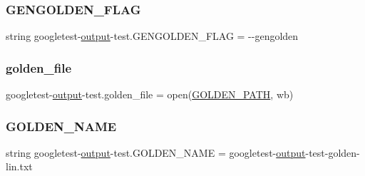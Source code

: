 \subsubsection{\texorpdfstring{GENGOLDEN\_FLAG}{GENGOLDEN\_FLAG}}
{\footnotesize\ttfamily string googletest-\/\mbox{\hyperlink{namespacegoogletest-output-test_ab3df9ce09186215a36c30454cf282417}{output}}-\/test.\+G\+E\+N\+G\+O\+L\+D\+E\+N\+\_\+\+F\+L\+AG = \textquotesingle{}-\/-\/gengolden\textquotesingle{}}

\mbox{\label{namespacegoogletest-output-test_a1f278fb4e124e36b91d94699d921b1c4}} 
\subsubsection{\texorpdfstring{golden\_file}{golden\_file}}
{\footnotesize\ttfamily googletest-\/\mbox{\hyperlink{namespacegoogletest-output-test_ab3df9ce09186215a36c30454cf282417}{output}}-\/test.\+golden\+\_\+file = open(\mbox{\hyperlink{namespacegoogletest-output-test_aaf2c3cbfc15d83d986e1e2ba99a94a3e}{G\+O\+L\+D\+E\+N\+\_\+\+P\+A\+TH}}, \textquotesingle{}wb\textquotesingle{})}

\mbox{\label{namespacegoogletest-output-test_a66b45fb215424c968b479fbf864f1e7f}} 
\subsubsection{\texorpdfstring{GOLDEN\_NAME}{GOLDEN\_NAME}}
{\footnotesize\ttfamily string googletest-\/\mbox{\hyperlink{namespacegoogletest-output-test_ab3df9ce09186215a36c30454cf282417}{output}}-\/test.\+G\+O\+L\+D\+E\+N\+\_\+\+N\+A\+ME = \textquotesingle{}googletest-\/\mbox{\hyperlink{namespacegoogletest-output-test_ab3df9ce09186215a36c30454cf282417}{output}}-\/test-\/golden-\/lin.\+txt\textquotesingle{}}

\mbox{\label{namespacegoogletest-output-test_aaf2c3cbfc15d83d986e1e2ba99a94a3e}} 
